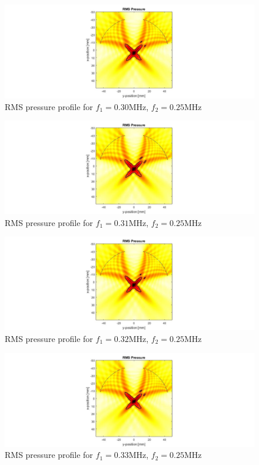\documentclass[10pt,a4paper]{article}
\begin{document}
\begin{figure}[!h]
\hspace*{-5cm}                                                    
\includegraphics[scale=0.6]{f300kHz}
\caption{RMS pressure profile for $f_1 = 0.30$MHz, $f_2 = 0.25$MHz}
\end{figure}
\begin{figure}[!h]
\hspace*{-5cm}                                                    
\includegraphics[scale=0.6]{f310kHz}
\caption{RMS pressure profile for $f_1 = 0.31$MHz, $f_2 = 0.25$MHz}
\end{figure}
\begin{figure}[!h]
\hspace*{-5cm}                                                    
\includegraphics[scale=0.6]{f320kHz}
\caption{RMS pressure profile for $f_1 = 0.32$MHz, $f_2 = 0.25$MHz}
\end{figure}
\begin{figure}[!h]
\hspace*{-5cm}                                                    
\includegraphics[scale=0.6]{f330kHz}
\caption{RMS pressure profile for $f_1 = 0.33$MHz, $f_2 = 0.25$MHz}
\end{figure}
\end{document}
